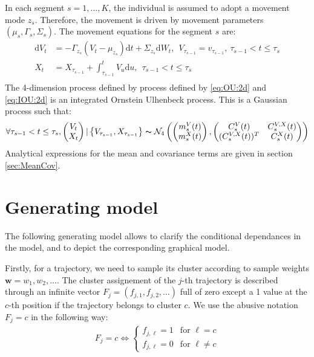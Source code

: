 \documentclass[10pt,a4paper]{article}
\newcommand{\rmd}{\text{d}}
\begin{document}
In each segment $s = 1,\dots, K$, the individual is assumed to adopt a movement mode $z_s$. Therefore, the movement is driven by movement parameters $(\mu_s, \Gamma_s, \Sigma_s)$. 
The movement equations for the segment $s$ are:
\begin{align}
\rmd V_t &= -\Gamma_{z_s} \left( V_t - \mu_{z_s} \right)\rmd t + \Sigma_{z_s} \rmd W_t,~~V_{\tau_{s - 1}} = v_{\tau_{s-1}},~\tau_{s - 1}< t \leq \tau_{s} \label{eq:OU:2d}\\
X_{t} &= X_{\tau_{s - 1}} + \int_{\tau_{s-1}}^{t} V_u \rmd u, ~ ~\tau_{s - 1}< t \leq \tau_{s}\label{eq:IOU:2d}\\
\end{align}
The 4-dimension process defined by process defined by \eqref{eq:OU:2d}  and \eqref{eq:IOU:2d} is an integrated Ornstein Ulhenbeck process. This is a Gaussian process such that:
\begin{equation}
\forall \tau_{s-1} < t \leq \tau_s,\begin{pmatrix}
V_t\\
X_t
\end{pmatrix}\vert\left\lbrace V_{\tau_{s - 1}},  X_{\tau_{s - 1}}\right\rbrace \thicksim \mathcal{N}_4\left(\begin{pmatrix}
m^V_s(t)\\
m^X_s(t)
\end{pmatrix}, \begin{pmatrix}
C^V_s(t) & C^{V,X}_s(t)\\
(C^{V,X}_s(t))^T & C^X_s(t)
\end{pmatrix} \right)\label{eq:4D:Gauss}
\end{equation}
Analytical expressions for the mean and covariance terms are given in section \ref{sec:MeanCov}.

\section{Generating model}
The following generating model allows to clarify the conditional dependances in the model, and to depict the corresponding graphical model.

Firstly, for a trajectory, we need to sample its cluster according to sample weights $\mathbf{w} = w_1,w_2, \dots$. The cluster assignement of the $j$-th trajectory is described through an infinite vector $F_j = (f_{j,1}, f_{j,2},\dots)$ full of zero except a 1 value at the $c$-th position if the trajectory belongs to cluster $c$. We use the abusive notation $F_j = c$ in the following way:
\begin{align*}
F_j = c \Leftrightarrow \left\lbrace \begin{array}{lr}
f_{j,\ell} = 1& \text{for } \ell = c\\
f_{j,\ell} = 0& \text{for } \ell \neq c
\end{array}\right.
\end{align*}
\end{document}
